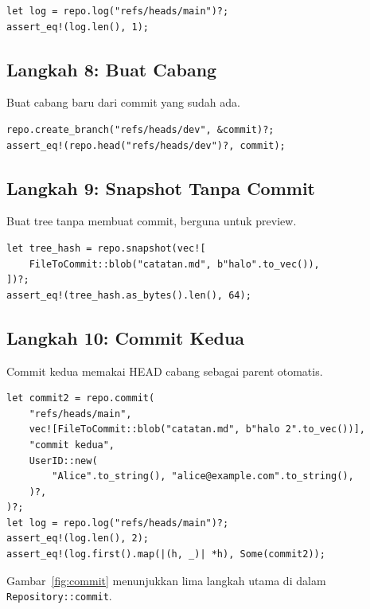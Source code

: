 \documentclass[11pt,a4paper]{article}
\begin{document}
\begin{lstlisting}[style=code]
let log = repo.log("refs/heads/main")?;
assert_eq!(log.len(), 1);
\end{lstlisting}

\subsection{Langkah 8: Buat Cabang}

Buat cabang baru dari commit yang sudah ada.

\begin{lstlisting}[style=code]
repo.create_branch("refs/heads/dev", &commit)?;
assert_eq!(repo.head("refs/heads/dev")?, commit);
\end{lstlisting}

\subsection{Langkah 9: Snapshot Tanpa Commit}

Buat tree tanpa membuat commit, berguna untuk preview.

\begin{lstlisting}[style=code]
let tree_hash = repo.snapshot(vec![
    FileToCommit::blob("catatan.md", b"halo".to_vec()),
])?;
assert_eq!(tree_hash.as_bytes().len(), 64);
\end{lstlisting}

\subsection{Langkah 10: Commit Kedua}

Commit kedua memakai HEAD cabang sebagai parent otomatis.

\begin{lstlisting}[style=code]
let commit2 = repo.commit(
    "refs/heads/main",
    vec![FileToCommit::blob("catatan.md", b"halo 2".to_vec())],
    "commit kedua",
    UserID::new(
        "Alice".to_string(), "alice@example.com".to_string(),
    )?,
)?;
let log = repo.log("refs/heads/main")?;
assert_eq!(log.len(), 2);
assert_eq!(log.first().map(|(h, _)| *h), Some(commit2));
\end{lstlisting}

Gambar~\ref{fig:commit} menunjukkan lima langkah utama di dalam \texttt{Repository::commit}.
\end{document}
